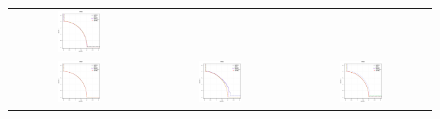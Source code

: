 \begin{figure}[h]
\begin{tabular}{ccc}
  \includegraphics[width=0.33\textwidth]{Figures_Chapter7/Results_Chapter3/WFG6.eps} 
\\
  \includegraphics[width=0.33\textwidth]{Figures_Chapter7/Results_Chapter3/WFG7.eps} &
  \includegraphics[width=0.33\textwidth]{Figures_Chapter7/Results_Chapter3/WFG8.eps} &
  \includegraphics[width=0.33\textwidth]{Figures_Chapter7/Results_Chapter3/WFG9.eps}
\end{tabular}
\end{figure}


